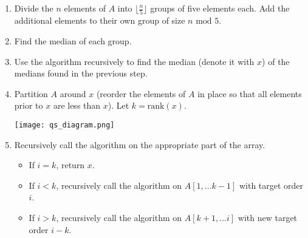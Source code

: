 \documentclass{beamer}
\begin{document}
\begin{frame}
    \scriptsize
    \begin{enumerate}
        \item Divide the $n$ elements of $A$ into $\lfloor \frac{n}{5}\rfloor$ groups of five elements each. Add the additional elements to their own group of size $n \text{ mod } 5$. 
        \item Find the median of each group. 
        \item Use the algorithm recursively to find the median (denote it with $x$) of the medians found in the previous step. 
        \item Partition $A$ around $x$ (reorder the elements of $A$ in place so that all elements prior to $x$ are less than $x$). Let $k = \text{rank}(x)$.
        \begin{center}
            \texttt{[image: qs\_diagram.png]}
        \end{center}
        \item Recursively call the algorithm on the appropriate part of the array. 
        \begin{itemize}
            \scriptsize
            \item If $i = k$, return $x$. 
            \item If $i < k$, recursively call the algorithm on $A[1, \dots k-1]$ with target order $i$.
            \item If $i > k$, recursively call the algorithm on $A[k + 1, \dots i]$ with new target order $i - k$. 
        \end{itemize}
    \end{enumerate}
\end{frame}
\end{document}
